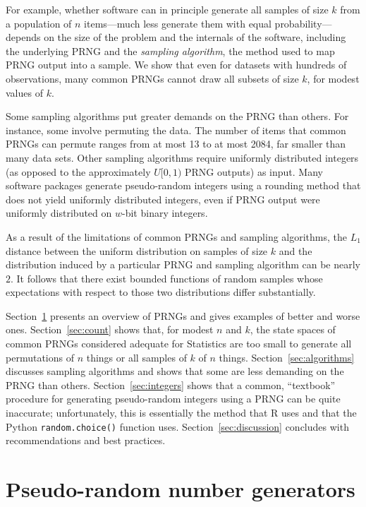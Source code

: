 \documentclass[graybox]{svmult}
\begin{document}
For example, whether software can in principle generate all samples of size $k$ from a population of
$n$ items---much less generate them with equal probability---depends on the size of the problem and the internals of the software, including the underlying PRNG and the \emph{sampling algorithm},
the method used to map PRNG output into a sample.
We show that even for datasets with hundreds of observations, 
many common PRNGs cannot draw all subsets of size $k$, for modest values of $k$.

Some sampling algorithms put greater demands on the PRNG than others.
For instance, some involve permuting the data.
The number of items that common PRNGs can permute ranges from at most 13 to at most 2084, far smaller than many data sets.
Other sampling algorithms require uniformly distributed integers (as opposed to the approximately $U[0,1)$ PRNG outputs) as input.
Many software packages generate
pseudo-random integers using a rounding method that does not yield uniformly distributed integers, even
if PRNG output were uniformly distributed on $w$-bit binary integers.

As a result of the limitations of common PRNGs and sampling algorithms,
the $L_1$ distance between the uniform distribution on samples of
size $k$ and the distribution induced by a particular PRNG and sampling algorithm can be nearly $2$.
It follows that there exist bounded functions of random samples whose expectations with respect to those two distributions differ substantially. 

Section~\ref{sec:prngs} presents an overview of PRNGs and gives examples of better and worse ones.
Section~\ref{sec:count} shows that, for modest $n$ and $k$, the state spaces of common PRNGs considered adequate for Statistics are too small to generate all permutations of 
$n$ things or all samples of $k$ of $n$ things. 
Section~\ref{sec:algorithms} discusses sampling algorithms and shows that some are less demanding on the PRNG than others. 
Section~\ref{sec:integers} shows that a common, ``textbook'' procedure for generating pseudo-random integers using a PRNG can be quite inaccurate; unfortunately, this is essentially the method that R uses
and that the Python \texttt{random.choice()} function uses.
Section~\ref{sec:discussion} concludes with recommendations and best practices.

\section{Pseudo-random number generators}
\label{sec:prngs}
\end{document}

